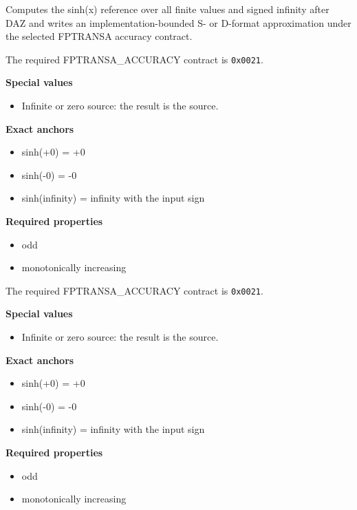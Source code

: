 Computes the sinh(x) reference over all finite values and signed infinity after DAZ and writes an implementation-bounded S- or D-format approximation under the selected FPTRANSA accuracy contract.

The required FPTRANSA\_ACCURACY contract is \texttt{0x0021}.

\textbf{Special values}\par
\begin{itemize}
\item Infinite or zero source: the result is the source.
\end{itemize}

\textbf{Exact anchors}\par
\begin{itemize}
\item sinh(+0) = +0
\item sinh(-0) = -0
\item sinh(infinity) = infinity with the input sign
\end{itemize}

\textbf{Required properties}\par
\begin{itemize}
\item odd
\item monotonically increasing
\end{itemize}

The required FPTRANSA\_ACCURACY contract is \texttt{0x0021}.

\textbf{Special values}\par
\begin{itemize}
\item Infinite or zero source: the result is the source.
\end{itemize}

\textbf{Exact anchors}\par
\begin{itemize}
\item sinh(+0) = +0
\item sinh(-0) = -0
\item sinh(infinity) = infinity with the input sign
\end{itemize}

\textbf{Required properties}\par
\begin{itemize}
\item odd
\item monotonically increasing
\end{itemize}
